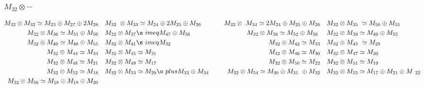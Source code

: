 \subsubsection{$M_32\otimes -$}
\begin{align*}
M_{32} \otimes M_{32} \simeq M_{23} \oplus M_{27} \oplus 2 M_{28} &&& M_{32} \
\otimes M_{33} \simeq M_{24} \oplus 2 M_{25} \oplus M_{26} &&& M_{32} \otimes \
M_{34} \simeq 2 M_{24} \oplus M_{25} \oplus M_{26} &&& M_{32} \otimes M_{35} \
\simeq M_{50} \oplus M_{55}\\
M_{32} \otimes M_{36} \simeq M_{51} \oplus M_{56} &&& M_{32} \otimes M_{37} \s\
imeq M_{47} \oplus M_{56} &&& M_{32} \otimes M_{38} \simeq M_{52} \oplus M_{56\
} &&& M_{32} \otimes M_{39} \simeq M_{49} \oplus M_{55}\\
M_{32} \otimes M_{40} \simeq M_{48} \oplus M_{55} &&& M_{32} \otimes M_{41} \s\
imeq M_{32} &&& M_{32} \otimes M_{42} \simeq M_{33} &&& M_{32} \otimes M_{43} \
\simeq M_{29}\\
M_{32} \otimes M_{44} \simeq M_{34} &&& M_{32} \otimes M_{45} \simeq M_{31} &&\
& M_{32} \otimes M_{46} \simeq M_{30} &&& M_{32} \otimes M_{47} \simeq M_{20}\
\\
M_{32} \otimes M_{48} \simeq M_{21} &&& M_{32} \otimes M_{49} \simeq M_{17} &&\
& M_{32} \otimes M_{50} \simeq M_{22} &&& M_{32} \otimes M_{51} \simeq M_{19}\
\\
M_{32} \otimes M_{52} \simeq M_{18} &&& M_{32} \otimes M_{53} \simeq M_{29} \o\
plus M_{33} \oplus M_{34} &&& M_{32} \otimes M_{54} \simeq M_{30} \oplus M_{31\
} \oplus M_{32} &&& M_{32} \otimes M_{55} \simeq M_{17} \oplus M_{21} \oplus M\
_{22}\\
M_{32} \otimes M_{56} \simeq M_{18} \oplus M_{19} \oplus M_{20}\\
\end{align*}

